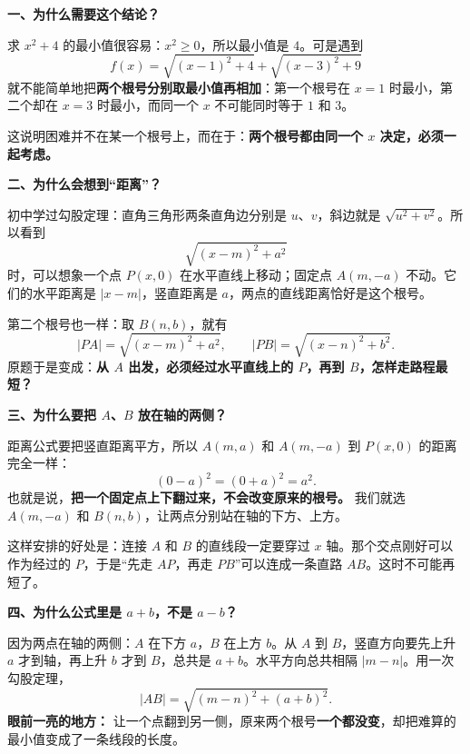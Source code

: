 \clearpage
\begin{explanationbox}
\textbf{\textcolor{CExplanation}{一、为什么需要这个结论？}}

求 $x^2+4$ 的最小值很容易：$x^2\geq0$，所以最小值是 $4$。可是遇到
\[
 f(x)=\sqrt{(x-1)^2+4}+\sqrt{(x-3)^2+9}
\]
就不能简单地把\textbf{两个根号分别取最小值再相加}：第一个根号在 $x=1$ 时最小，第二个却在 $x=3$ 时最小，而同一个 $x$ 不可能同时等于 $1$ 和 $3$。

这说明困难并不在某一个根号上，而在于：\textbf{两个根号都由同一个 $x$ 决定，必须一起考虑。}



\medskip
\textbf{\textcolor{CExplanation}{二、为什么会想到“距离”？}}

初中学过勾股定理：直角三角形两条直角边分别是 $u$、$v$，斜边就是 $\sqrt{u^2+v^2}$。所以看到
\[
 \sqrt{(x-m)^2+a^2}
\]
时，可以想象一个点 $P(x,0)$ 在水平直线上移动；固定点 $A(m,-a)$ 不动。它们的水平距离是 $|x-m|$，竖直距离是 $a$，两点的直线距离恰好是这个根号。

第二个根号也一样：取 $B(n,b)$，就有
\[
 |PA|=\sqrt{(x-m)^2+a^2},\qquad
 |PB|=\sqrt{(x-n)^2+b^2}.
\]
原题于是变成：\textbf{从 $A$ 出发，必须经过水平直线上的 $P$，再到 $B$，怎样走路程最短？}

\medskip
\end{explanationbox}
\clearpage
\begin{explanationbox}
\textbf{\textcolor{CExplanation}{三、为什么要把 $A$、$B$ 放在轴的两侧？}}

距离公式要把竖直距离平方，所以 $A(m,a)$ 和 $A(m,-a)$ 到 $P(x,0)$ 的距离完全一样：
\[
 (0-a)^2=(0+a)^2=a^2.
\]
也就是说，\textbf{把一个固定点上下翻过来，不会改变原来的根号。} 我们就选 $A(m,-a)$ 和 $B(n,b)$，让两点分别站在轴的下方、上方。

这样安排的好处是：连接 $A$ 和 $B$ 的直线段一定要穿过 $x$ 轴。那个交点刚好可以作为经过的 $P$，于是“先走 $AP$，再走 $PB$”可以连成一条直路 $AB$。这时不可能再短了。





\medskip
\textbf{\textcolor{CExplanation}{四、为什么公式里是 $a+b$，不是 $a-b$？}}

因为两点在轴的两侧：$A$ 在下方 $a$，$B$ 在上方 $b$。从 $A$ 到 $B$，竖直方向要先上升 $a$ 才到轴，再上升 $b$ 才到 $B$，总共是 $a+b$。水平方向总共相隔 $|m-n|$。用一次勾股定理，
\[
 |AB|=\sqrt{(m-n)^2+(a+b)^2}.
\]
\textbf{眼前一亮的地方：} 让一个点翻到另一侧，原来两个根号\textbf{一个都没变}，却把难算的最小值变成了一条线段的长度。

\medskip
\end{explanationbox}

